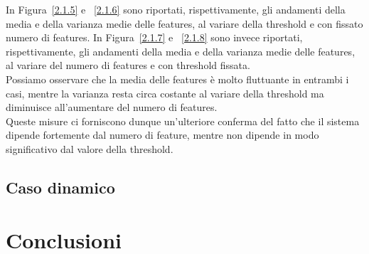 \documentclass[a4paper,10pt]{article}
\begin{document}
In Figura~\ref{2.1.5} e ~\ref{2.1.6} sono riportati, rispettivamente, gli andamenti della media e della varianza medie delle features, al variare della threshold e con fissato numero di features.
In Figura~\ref{2.1.7} e ~\ref{2.1.8} sono invece riportati, rispettivamente, gli andamenti della media e della varianza medie delle features, al variare del numero di features e con threshold fissata.
\\Possiamo osservare che la media delle features \`{e} molto fluttuante in entrambi i casi, mentre la varianza resta circa costante al variare della threshold ma diminuisce all'aumentare del numero di features.
\\Queste misure ci forniscono dunque un'ulteriore conferma del fatto che il sistema dipende fortemente dal numero di feature, mentre non dipende in modo significativo dal valore della threshold. 

\subsection{Caso dinamico}

\section{Conclusioni}
\end{document}
